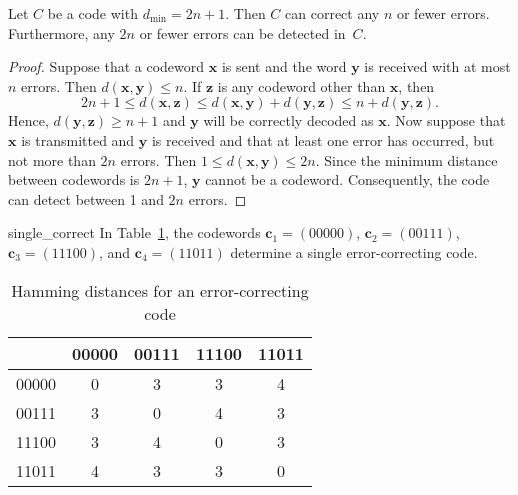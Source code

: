  
\begin{theorem}
Let $C$ be a code with $d_{\min} = 2n + 1$. Then $C$ can correct any
$n$ or fewer errors.  Furthermore, any $2n$ or fewer errors can be
detected in~$C$. 
\end{theorem}
 
 
\begin{proof}
Suppose that a codeword ${\mathbf x}$ is sent and the word ${\mathbf y}$
is received with at most $n$ errors. Then $d( {\mathbf x}, {\mathbf y})
\leq n$. If ${\mathbf z}$ is any codeword other than ${\mathbf x}$, then
\[
2n+1
\leq
d( {\mathbf x}, {\mathbf z})
\leq
d( {\mathbf x}, {\mathbf y}) + d( {\mathbf y}, {\mathbf z})
\leq
n + d( {\mathbf y}, {\mathbf z}).
\]
Hence, $d({\mathbf y}, {\mathbf z} ) \geq n+1$ and ${\mathbf y}$ will be
correctly decoded as ${\mathbf x}$. Now suppose that ${\mathbf x}$ is
transmitted and ${\mathbf y}$ is received and that at least one error 
has occurred, but not more than $2n$ errors. Then $1 \leq d( {\mathbf x},
{\mathbf y} ) \leq 2n$.  Since the minimum distance between codewords is
$2n +1$, ${\mathbf y}$ cannot be a codeword.  Consequently, the code can
detect between 1 and $2n$ errors. 
\end{proof}
 
 
\begin{example}{single_correct}
In Table~\ref{Hamming_dist}, the codewords ${\mathbf c}_1 = (00000)$, ${\mathbf c}_2 = (00111)$,
${\mathbf c}_3 = (11100)$, and ${\mathbf c}_4 = (11011)$ determine a
single error-correcting code.  
\end{example}
 
 
\begin{table}[htb]

\begin{center}
{\small
\begin{tabular}{|c|cccc|}
\hline
      & 00000 & 00111 & 11100 & 11011 \\ \hline
00000 & 0     & 3     & 3     & 4 \\
00111 & 3     & 0     & 4     & 3 \\
11100 & 3     & 4     & 0     & 3 \\
11011 & 4     & 3     & 3     & 0 \\
\hline
\end{tabular}
}
\caption{ Hamming distances for an error-correcting code}\label{Hamming_dist}
\end{center}
\end{table}
 
 
 

